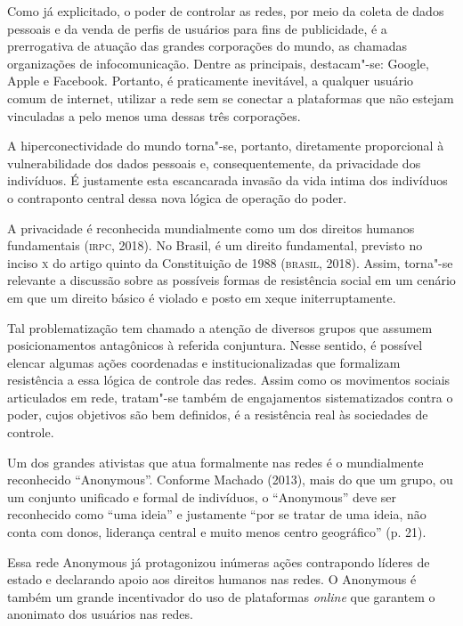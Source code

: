 Como já explicitado, o poder de controlar as redes, por meio da coleta
de dados pessoais e da venda de perfis de usuários para fins de
publicidade, é a prerrogativa de atuação das grandes corporações do
mundo, as chamadas organizações de infocomunicação. Dentre as
principais, destacam"-se: Google, Apple e Facebook. Portanto, é
praticamente inevitável, a qualquer usuário comum de internet, utilizar
a rede sem se conectar a plataformas que não estejam vinculadas a pelo
menos uma dessas três corporações.

A hiperconectividade do mundo torna"-se, portanto, diretamente
proporcional à vulnerabilidade dos dados pessoais e, consequentemente,
da privacidade dos indivíduos. É justamente esta escancarada invasão da
vida intima dos indivíduos o contraponto central dessa nova lógica de
operação do poder.

A privacidade é reconhecida mundialmente como um dos direitos humanos
fundamentais (\textsc{irpc}, 2018). No Brasil, é um direito fundamental, previsto
no inciso \textsc{x} do artigo quinto da Constituição de 1988 (\textsc{brasil}, 2018).
Assim, torna"-se relevante a discussão sobre as possíveis formas de
resistência social em um cenário em que um direito básico é violado e
posto em xeque initerruptamente.

Tal problematização tem chamado a atenção de diversos grupos que assumem
posicionamentos antagônicos à referida conjuntura. Nesse sentido, é
possível elencar algumas ações coordenadas e institucionalizadas que
formalizam resistência a essa lógica de controle das redes. Assim como
os movimentos sociais articulados em rede, tratam"-se também de
engajamentos sistematizados contra o poder, cujos objetivos são bem
definidos, é a resistência real às sociedades de controle.

Um dos grandes ativistas que atua formalmente nas redes é o mundialmente
reconhecido ``Anonymous''. Conforme Machado (2013), mais do que um
grupo, ou um conjunto unificado e formal de indivíduos, o ``Anonymous''
deve ser reconhecido como ``uma ideia'' e justamente ``por se tratar de
uma ideia, não conta com donos, liderança central e muito menos centro
geográfico'' (p. 21).

Essa rede Anonymous já protagonizou inúmeras ações contrapondo líderes
de estado e declarando apoio aos direitos humanos nas redes. O Anonymous
é também um grande incentivador do uso de plataformas \emph{online} que
garantem o anonimato dos usuários nas redes.

